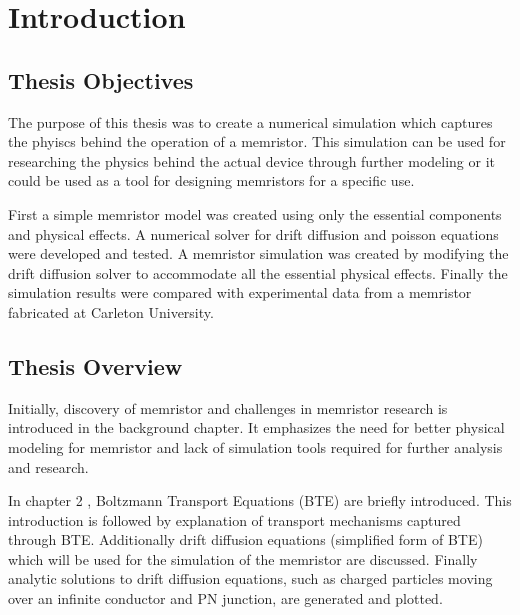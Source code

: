 
\chapter{Introduction} %


\label{Chapter1} %


\section{Thesis Objectives}
\begin{doublespace}
The purpose of this thesis was to create a numerical simulation which captures the phyiscs behind the operation of a memristor. This simulation can be used for researching the physics behind the actual device through further modeling or it could be used as a tool for designing memristors for a specific use. 

First a simple memristor model was created using only the essential components and physical effects. A numerical solver for drift diffusion and poisson equations were developed and tested. A memristor simulation was created by modifying the drift diffusion solver to accommodate all the essential physical effects. Finally the simulation results were compared with experimental data from a memristor fabricated at Carleton University.

\section{Thesis Overview}

Initially, discovery of memristor and challenges in memristor research is introduced in the background chapter. It emphasizes the need for better physical modeling for memristor and lack of simulation tools required for further analysis and research.

In chapter 2 , Boltzmann Transport Equations (BTE) are briefly introduced. This introduction is followed by explanation of transport mechanisms captured through BTE. Additionally drift diffusion equations (simplified form of BTE) which will be used for the simulation of the memristor are discussed. Finally analytic solutions to drift diffusion equations, such as charged particles moving over an infinite conductor and PN junction, are generated and plotted. 


\end{doublespace}
